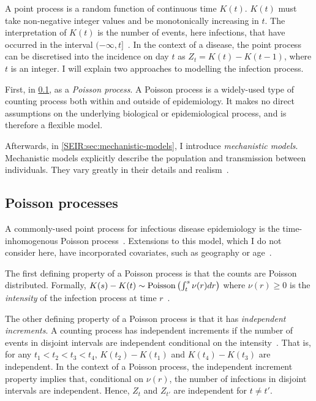 \documentclass[thesis.tex]{subfiles}
\begin{document}
A point process is a random function of continuous time $K(t)$.
$K(t)$ must take non-negative integer values and be monotonically increasing in $t$.
The interpretation of $K(t)$ is the number of events, here infections, that have occurred in the interval $(-\infty, t]$~\autocite[244]{yanDistribution}.
In the context of a disease, the point process can be discretised into the incidence on day $t$ as $Z_t = K(t) - K(t-1)$, where $t$ is an integer.
I will explain two approaches to modelling the infection process.

First, in \cref{inc-prev:sec:poisson-process}, as a \emph{Poisson process}.
A Poisson process is a widely-used type of counting process both within and outside of epidemiology.
It makes no direct assumptions on the underlying biological or epidemiological process, and is therefore a flexible model.

Afterwards, in \cref{SEIR:sec:mechanistic-models}, I introduce \emph{mechanistic models}.
Mechanistic models explicitly describe the population and transmission between individuals.
They vary greatly in their details and realism~\autocite{murilloMultiscale}.

\subsection{Poisson processes} \label{inc-prev:sec:poisson-process}

A commonly-used point process for infectious disease epidemiology is the time-inhomogenous Poisson process~\autocite[e.g., in the context of HIV,][]{brookmeyerMethod,paganoHIV,rosenbergBackcalculation,brookmeyerBackcalculation}.
Extensions to this model, which I do not consider here, have incorporated covariates, such as geography or age~\autocite[e.g.][]{diggleModeling}.

The first defining property of a Poisson process is that the counts are Poisson distributed.
Formally, $K(s) - K(t) \sim \operatorname{Poisson}\left(\int^s_t \nu(r) dr \right)$ where $\nu(r) \geq 0$ is the \emph{intensity} of the infection process at time $r$~\autocite[244]{yanDistribution}.

The other defining property of a Poisson process is that it has \emph{independent increments}.
A counting process has independent increments if the number of events in disjoint intervals are independent conditional on the intensity~\autocite[244]{yanDistribution}.
That is, for any $t_1 < t_2 < t_3 < t_4$, $K(t_2) - K(t_1)$ and $K(t_4) - K(t_3)$ are independent.
In the context of a Poisson process, the independent increment property implies that, conditional on $\nu(r)$, the number of infections in disjoint intervals are independent.
Hence, $Z_t$ and $Z_{t'}$ are independent for $t \neq t'$.
\end{document}
